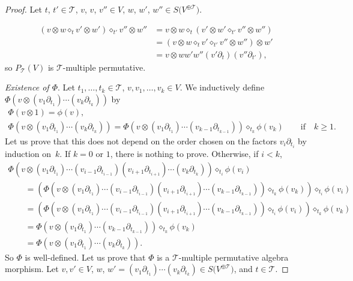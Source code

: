 \documentclass[pdftex]{sigma}
\numberwithin{equation}{section}
\newcommand{\T}{\mathcal{T}}
\begin{document}
\begin{proof}
Let $t$, $t'\in \T$, $v$, $v$, $v'' \in V$,
$w$, $w'$, $w''\in S\big(V^{\oplus\T}\big)$.
{\samepage\begin{align*}
(v\otimes w \diamond_t v'\otimes w')\diamond_{t'} v''\otimes w''
&=v\otimes w \diamond_t (v'\otimes w'\diamond_{t'} v''\otimes w'')\\[.5ex]
&=(v\otimes w \diamond_t v'\diamond_{t'} v''\otimes w'')\otimes w'\\[.5ex]
&=v\otimes ww'w'' (v'\partial_t)(v''\partial_{t'}),
\end{align*}
so $P_\T(V)$ is $\T$-multiple permutative.

}

\textit{Existence of $\Phi$}. Let $t_1,\dots,t_k\in \T$, $v,v_1,\dots,v_k\in V$. We inductively
define $\Phi(v\otimes (v_1\partial_{t_1})\cdots \allowbreak
(v_k\partial_{t_k}))$ by
\begin{gather*}
\Phi(v\otimes 1)=\phi(v),
\\[.5ex]
\Phi(v\otimes (v_1\partial_{t_1})\cdots (v_k\partial_{t_k}))
=\Phi(v\otimes (v_1\partial_{t_1})\cdots (v_{k-1}\partial_{t_{k-1}})) \diamond_{t_k} \phi(v_k)\qquad \mbox{if}\quad k\geq 1.
\end{gather*}
Let us prove that this does not depend on the order chosen on the factors $v_i\partial_{t_i}$ by induction on~$k$.
If $k=0$ or $1$, there is nothing to prove. Otherwise, if $i<k$,
\begin{gather*}
\Phi(v\otimes (v_1\partial_{t_1})\cdots (v_{i-1}\partial_{t_{i-1}})(v_{i+1}\partial_{t_{i+1}})\cdots
(v_k\partial_{t_k}))\diamond_{t_i} \phi(v_i)
\\[.5ex] \qquad
{}=(\Phi(v\otimes (v_1\partial_{t_1})\cdots (v_{i-1}\partial_{t_{i-1}})(v_{i+1}\partial_{t_{i+1}})\cdots
(v_{k-1}\partial_{t_{k-1}}))\diamond_{t_k} \phi(v_k))\diamond_{t_i} \phi(v_i)
\\[.5ex] \qquad
{}=(\Phi(v\otimes (v_1\partial_{t_1})\cdots (v_{i-1}\partial_{t_{i-1}})(v_{i+1}\partial_{t_{i+1}})\cdots
(v_{k-1}\partial_{t_{k-1}}))\diamond_{t_i} \phi(v_i))\diamond_{t_k} \phi(v_k)
\\[.5ex] \qquad
{}=\Phi(v\otimes (v_1\partial_{t_1})\cdots (v_{k-1}\partial_{t_{k-1}}))\diamond_{t_k} \phi(v_k)
\\[.5ex] \qquad
{}=\Phi(v\otimes (v_1\partial_{t_1})\cdots (v_k\partial_{t_k})).
\end{gather*}
So $\Phi$ is well-defined. Let us prove that $\Phi$ is a $\T$-multiple permutative algebra morphism.
Let $v,v'\in V$, $w$, $w'=(v_1\partial_{t_1})\cdots (v_k\partial_{t_k}) \in S\big(V^{\oplus\T}\big)$, and $t\in \T$.

\end{proof}
\end{document}
